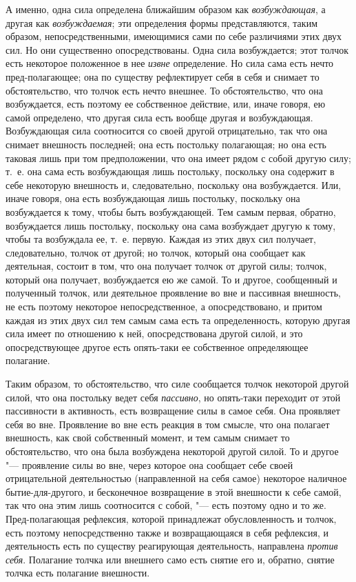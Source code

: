 А именно, одна сила определена ближайшим образом как
{\em возбуждающая}, а другая как {\em возбуждаемая}; эти определения формы
представляются, таким образом, непосредственными, имеющимися сами по себе
различиями этих двух сил. Но они существенно опосредствованы. Одна сила
возбуждается; этот толчок есть некоторое положенное в нее
{\em извне} определение. Но сила сама есть нечто
пред-полагающее; она по существу рефлектирует себя в себя и снимает то
обстоятельство, что толчок есть нечто внешнее. То обстоятельство, что она
возбуждается, есть поэтому ее собственное действие, или, иначе говоря, ею
самой определено, что другая сила есть вообще другая и возбуждающая.
Возбуждающая сила соотносится со своей другой отрицательно, так что она
снимает внешность последней; она есть постольку полагающая; но она есть
таковая лишь при том предположении, что она имеет рядом с собой другую
силу; т.~е. она сама есть возбуждающая лишь постольку, поскольку она
содержит в себе некоторую внешность и, следовательно, поскольку она
возбуждается. Или, иначе говоря, она есть возбуждающая лишь постольку,
поскольку она возбуждается к тому, чтобы быть возбуждающей. Тем самым
первая, обратно, возбуждается лишь постольку, поскольку она сама возбуждает
другую к тому, чтобы та возбуждала ее, т.~е. первую. Каждая из этих двух
сил получает, следовательно, толчок от другой; но толчок, который она
сообщает как деятельная, состоит в том, что она получает толчок от другой
силы; толчок, который она получает, возбуждается ею же самой. То и другое,
сообщенный и полученный толчок, или деятельное проявление во вне и
пассивная внешность, не есть поэтому некоторое непосредственное, а
опосредствовано, и притом каждая из этих двух сил тем самым сама есть та
определенность, которую другая сила имеет по отношению к ней,
опосредствована другой силой, и это опосредствующее другое есть опять-таки
ее собственное определяющее полагание.

Таким образом, то обстоятельство, что силе сообщается толчок некоторой
другой силой, что она постольку ведет себя
{\em пассивно}, но опять-таки переходит от этой
пассивности в активность, есть возвращение силы в самое себя. Она проявляет
себя во вне. Проявление во вне есть реакция в том смысле, что она полагает
внешность, как свой собственный момент, и тем самым снимает то
обстоятельство, что она была возбуждена некоторой другой силой. То и другое
"--- проявление силы во вне, через которое она сообщает себе своей
отрицательной деятельностью (направленной на себя самое) некоторое наличное
бытие-для-другого, и бесконечное возвращение в этой внешности к себе самой,
так что она этим лишь соотносится с собой, "--- есть поэтому одно и то же.
Пред-полагающая рефлексия, которой принадлежат обусловленность и толчок,
есть поэтому непосредственно также и возвращающаяся в себя рефлексия, и
деятельность есть по существу реагирующая деятельность, направлена
{\em против себя}. Полагание толчка или внешнего само
есть снятие его и, обратно, снятие толчка есть полагание внешности.


